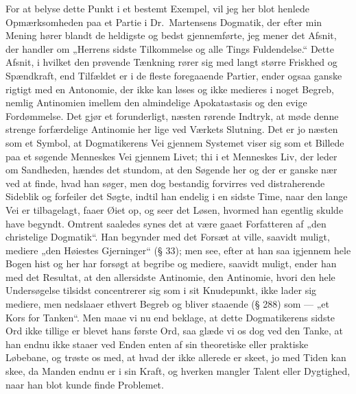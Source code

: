 For at belyse dette Punkt i et bestemt Exempel, vil jeg her blot
henlede Opmærksomheden paa et Partie i Dr.\ Martensens Dogmatik,
der efter min Mening hører blandt de heldigste og bedst
gjennemførte, jeg mener det Afsnit, der handler om „Herrens sidste
Tilkommelse og alle Tings Fuldendelse.“ Dette Afsnit, i hvilket
den prøvende Tænkning rører sig med langt større Friskhed og
Spændkraft, end Tilfældet er i de fleste foregaaende Partier,
ender ogsaa ganske rigtigt med en Antonomie, der ikke kan løses og
ikke medieres i noget Begreb, nemlig Antinomien imellem den
almindelige Apokatastasis og den evige Fordømmelse. Det gjør et
forunderligt, næsten rørende Indtryk, at møde denne strenge
forfærdelige Antinomie her lige ved Værkets Slutning. Det er jo
næsten som et Symbol, at Dogmatikerens Vei gjennem Systemet viser
sig som et Billede paa et søgende Menneskes Vei gjennem Livet; thi
i et Menneskes Liv, der leder om Sandheden, hændes det stundom, at
den Søgende her og der er ganske nær ved at finde, hvad han søger,
men dog bestandig forvirres ved distraherende Sideblik og forfeiler
det Søgte, indtil han endelig i en sidste Time, naar den lange Vei
er tilbagelagt, faaer Øiet op, og seer det Løsen, hvormed han
egentlig skulde have begyndt. Omtrent saaledes synes det at være
gaaet Forfatteren af „den christelige
 Dogmatik“. Han begynder med det Forsæt at ville, saavidt muligt,
mediere „den Høiestes Gjerninger“ (§ 33); men see, efter at han
saa igjennem hele Bogen hist og her har forsøgt at begribe og
mediere, saavidt muligt, ender han med det Resultat, at den
allersidste Antinomie, den Antinomie, hvori den hele Undersøgelse
tilsidst concentrerer sig som i sit Knudepunkt, ikke lader sig
mediere, men nedslaaer ethvert Begreb og bliver staaende (§ 288)
som --- „et Kors for Tanken“. Men maae vi nu end beklage, at dette
Dogmatikerens sidste Ord ikke tillige er blevet hans første Ord,
saa glæde vi os dog ved den Tanke, at han endnu ikke staaer ved
Enden enten af sin theoretiske eller praktiske Løbebane, og trøste
os med, at hvad der ikke allerede er skeet, jo med Tiden kan skee,
da Manden endnu er i sin Kraft, og hverken mangler Talent eller
Dygtighed, naar han blot kunde finde Problemet.


